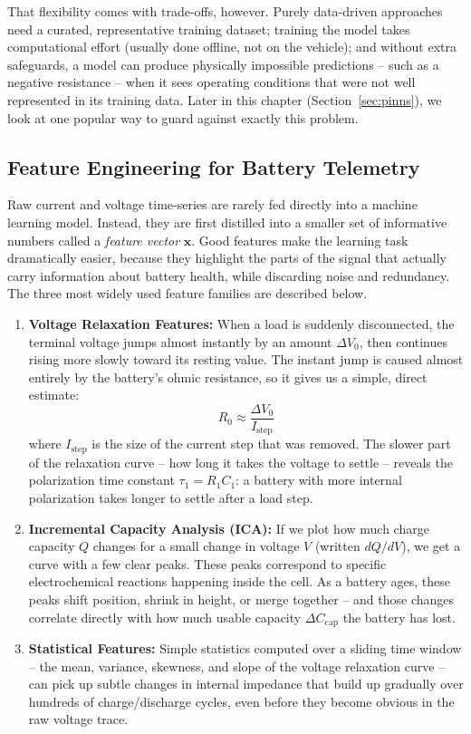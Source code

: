 That flexibility comes with trade-offs, however. Purely data-driven approaches need a curated, representative training dataset; training the model takes computational effort (usually done offline, not on the vehicle); and without extra safeguards, a model can produce physically impossible predictions -- such as a negative resistance -- when it sees operating conditions that were not well represented in its training data. Later in this chapter (Section~\ref{sec:pinns}), we look at one popular way to guard against exactly this problem.

\subsection{Feature Engineering for Battery Telemetry}
Raw current and voltage time-series are rarely fed directly into a machine learning model. Instead, they are first distilled into a smaller set of informative numbers called a \emph{feature vector} $\mathbf{x}$. Good features make the learning task dramatically easier, because they highlight the parts of the signal that actually carry information about battery health, while discarding noise and redundancy. The three most widely used feature families are described below.

\begin{enumerate}
    \item \textbf{Voltage Relaxation Features:} When a load is suddenly disconnected, the terminal voltage jumps almost instantly by an amount $\Delta V_0$, then continues rising more slowly toward its resting value. The instant jump is caused almost entirely by the battery's ohmic resistance, so it gives us a simple, direct estimate:
    \begin{equation}
    R_0 \approx \frac{\Delta V_0}{I_{\text{step}}}
    \label{eq:ch8_r0_estimate}
    \end{equation}
    where $I_{\text{step}}$ is the size of the current step that was removed. The slower part of the relaxation curve -- how long it takes the voltage to settle -- reveals the polarization time constant $\tau_1 = R_1 C_1$: a battery with more internal polarization takes longer to settle after a load step.
    \item \textbf{Incremental Capacity Analysis (ICA):} If we plot how much charge capacity $Q$ changes for a small change in voltage $V$ (written $dQ/dV$), we get a curve with a few clear peaks. These peaks correspond to specific electrochemical reactions happening inside the cell. As a battery ages, these peaks shift position, shrink in height, or merge together -- and those changes correlate directly with how much usable capacity $\Delta C_{\text{cap}}$ the battery has lost.
    \item \textbf{Statistical Features:} Simple statistics computed over a sliding time window -- the mean, variance, skewness, and slope of the voltage relaxation curve -- can pick up subtle changes in internal impedance that build up gradually over hundreds of charge/discharge cycles, even before they become obvious in the raw voltage trace.
\end{enumerate}

